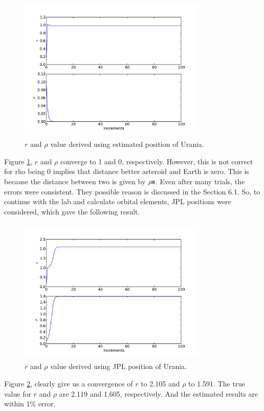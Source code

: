 \documentclass[a4paper,12pt]{article}
\begin{document}
\label{sec:orbit}
\begin{figure}[H]
\centering
	\includegraphics [angle=0,height=7cm,width=9cm]{pic/wrong_rho.pdf} 
\caption{$r$ and $\rho$ value derived using estimated position of Urania.}
\label{fig:wrong}
\end{figure}
Figure \ref{fig:wrong}, $r$ and $\rho$ converge to 1 and 0, respectively. However, this is not correct for rho being 0 implies that distance better asteroid and Earth is zero. This is because the distance between two is given by $\rho \bf{s}$. Even after many trials, the errors were consistent. They possible reason is discussed in the Section 6.1. So, to continue with the lab and calculate orbital elements, JPL positions were considered, which gave the following result. 

\label{sec:orbit}
\begin{figure}[H]
\centering
	\includegraphics [angle=0,height=7cm,width=9cm]{pic/urania_rho.pdf} 
\caption{$r$ and $\rho$ value derived using JPL position of Urania.}
\label{fig:rho}
\end{figure}
Figure \ref{fig:rho}, clearly give us a convergence of $r$ to 2.105 and $\rho$ to 1.591. The true value for $r$ and $\rho$ are 2.119 and 1.605, respectively. And the estimated results are within 1\% error. 
\end{document}
